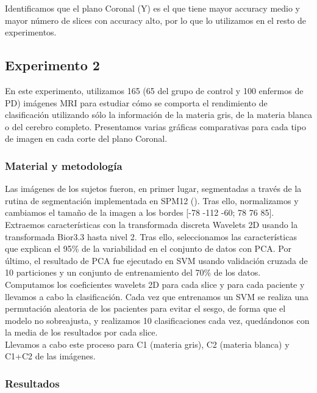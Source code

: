 Identificamos que el plano Coronal (Y) es el que tiene mayor accuracy medio y mayor número de slices con accuracy alto, por lo que lo utilizamos en el resto de experimentos.

\newpage 
\subsection{Experimento 2}

En este experimento, utilizamos 165 (65 del grupo de control y 100 enfermos de PD) imágenes MRI para estudiar cómo se comporta el rendimiento de clasificación utilizando sólo la información de la materia gris, de la materia blanca o del cerebro completo. Presentamos varias gráficas comparativas para cada tipo de imagen en cada corte del plano Coronal.

\subsubsection{Material y metodología}

Las imágenes de los sujetos fueron, en primer lugar, segmentadas a través de la rutina de segmentación implementada en SPM12 (\cite{spm}). Tras ello, normalizamos y cambiamos el tamaño de la imagen a los bordes [-78 -112 -60; 78 76 85]. Extraemos características con la transformada discreta Wavelets 2D usando la transformada Bior3.3 hasta nivel 2. Tras ello, seleccionamos las características que explican el 95\% de la variabilidad en el conjunto de datos con PCA. Por último, el resultado de PCA fue ejecutado en SVM usando validación cruzada de 10 particiones y un conjunto de entrenamiento del 70\% de los datos. \\

Computamos los coeficientes wavelets 2D para cada slice y para cada paciente y llevamos a cabo la clasificación. Cada vez que entrenamos un SVM se realiza una permutación aleatoria de los pacientes para evitar el sesgo, de forma que el modelo no sobreajusta, y realizamos 10 clasificaciones cada vez, quedándonos con la media de los resultados por cada slice. \\

Llevamos a cabo este proceso para C1 (materia gris), C2 (materia blanca) y C1+C2 de las imágenes. 

\subsubsection{Resultados}


